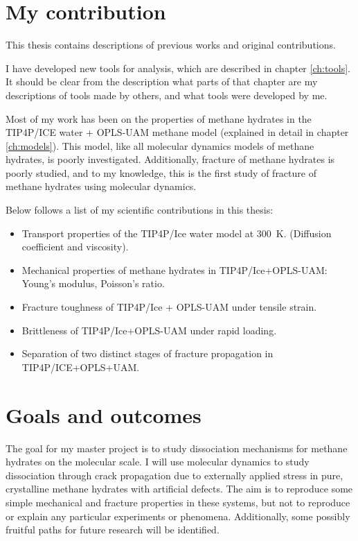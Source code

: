 \section{My contribution}
This thesis contains descriptions of previous works and original contributions.

I have developed new tools for analysis, which are described in chapter \ref{ch:tools}. It should be clear from the description what parts of that chapter are my descriptions of tools made by others, and what tools were developed by me.

Most of my work has been on the properties of methane hydrates in the TIP4P/ICE water + OPLS-UAM methane model (explained in detail in chapter \ref{ch:models}). This model, like all molecular dynamics models of methane hydrates, is poorly investigated. Additionally, fracture of methane hydrates is poorly studied, and to my knowledge, this is the first study of fracture of methane hydrates using molecular dynamics. 

Below follows a list of my scientific contributions in this thesis:

\begin{itemize}
\item Transport properties of the TIP4P/Ice water model at \SI{300}{\kelvin}. (Diffusion coefficient and viscosity).
\item Mechanical properties of methane hydrates in TIP4P/Ice+OPLS-UAM: Young's modulus, Poisson's ratio.
\item Fracture toughness of TIP4P/Ice + OPLS-UAM under tensile strain.
\item Brittleness of TIP4P/Ice+OPLS-UAM under rapid loading.
\item Separation of two distinct stages of fracture propagation in TIP4P/ICE+OPLS+UAM. 
\end{itemize}

\section{Goals and outcomes}
The goal for my master project is to study dissociation mechanisms for methane hydrates on the molecular scale. I will use molecular dynamics to study dissociation through crack propagation due to externally applied stress in pure, crystalline methane hydrates with artificial defects. The aim is to reproduce some simple mechanical and fracture properties in these systems, but not to reproduce or explain any particular experiments or phenomena. Additionally, some possibly fruitful paths for future research will be identified.

